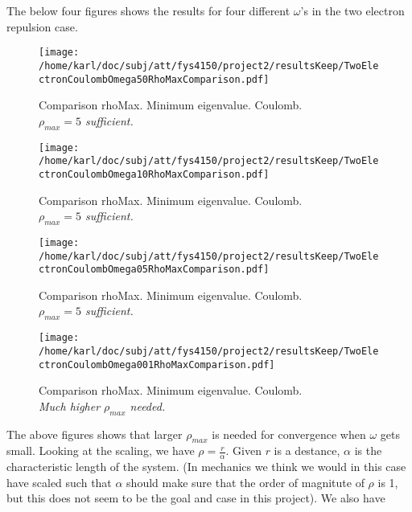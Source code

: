\documentclass{article}
\begin{document}
The below four figures shows the results for four different $\omega$'s in the two electron repulsion case.

\begin{minipage}{.49\textwidth} %
	\begin{figure}[H]
		\centering
		\texttt{[image: /home/karl/doc/subj/att/fys4150/project2/resultsKeep/TwoElectronCoulombOmega50RhoMaxComparison.pdf]}
		\caption{Comparison rhoMax. Minimum eigenvalue. Coulomb. \\
			\textit{$\rho_{max} = 5$ sufficient.}}
		\label{1}
	\end{figure}
\end{minipage}\hfill
\begin{minipage}{.49\textwidth}
	\begin{figure}[H]
		\centering
		\texttt{[image: /home/karl/doc/subj/att/fys4150/project2/resultsKeep/TwoElectronCoulombOmega10RhoMaxComparison.pdf]}
		\caption{Comparison rhoMax. Minimum eigenvalue. Coulomb. \\
			\textit{$\rho_{max} = 5$ sufficient.}}
		\label{1}
	\end{figure}
\end{minipage}\hfill
\begin{minipage}{.49\textwidth}
	\begin{figure}[H]
		\centering
		\texttt{[image: /home/karl/doc/subj/att/fys4150/project2/resultsKeep/TwoElectronCoulombOmega05RhoMaxComparison.pdf]}
		\caption{Comparison rhoMax. Minimum eigenvalue. Coulomb. \\
		\textit{$\rho_{max} = 5$ sufficient.}}
		\label{1}
	\end{figure}
\end{minipage}\hfill
\vspace{2ex}
\begin{minipage}{.49\textwidth}
	\begin{figure}[H]
		\centering
		\texttt{[image: /home/karl/doc/subj/att/fys4150/project2/resultsKeep/TwoElectronCoulombOmega001RhoMaxComparison.pdf]}
		\caption{Comparison rhoMax. Minimum eigenvalue. Coulomb. \\
			\textit{Much higher $\rho_{max}$ needed.}}
		\label{1}
	\end{figure}
\end{minipage}\hfill
\vspace{2ex}

The above figures shows that larger $\rho_{max}$ is needed for convergence when $\omega$ gets small. Looking at the scaling, we have $\rho = \frac{r}{\alpha}$. Given $r$ is a destance, $\alpha$ is the characteristic length of the system. (In mechanics we think we would in this case have scaled such that $\alpha$ should make sure that the order of magnitute of $\rho$ is 1, but this does not seem to be the goal and case in this project). We also have 
\end{document}
